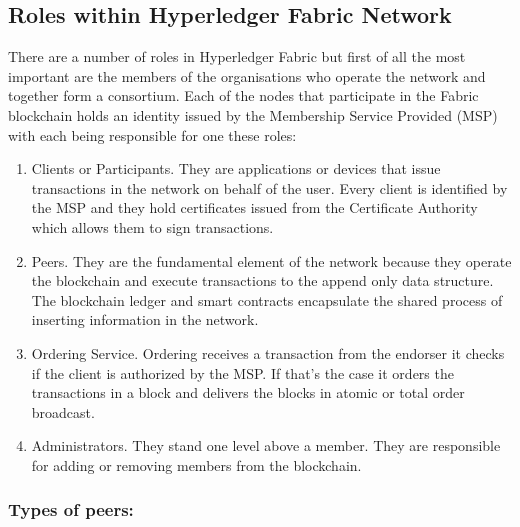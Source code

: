 \subsection{Roles within Hyperledger Fabric Network}
There are a number of roles in Hyperledger Fabric but first of all the most important are the members of the organisations who operate the network and together form a consortium.
Each of the nodes that participate in the Fabric blockchain holds an identity issued by the Membership Service Provided (MSP) with each being responsible for one these roles:
\begin{enumerate}
  \item Clients or Participants. They are applications or devices that issue transactions in the network on behalf of the user. Every client is identified by the MSP and they hold certificates issued from the Certificate Authority which allows them to sign transactions.
  \item Peers. They are the fundamental element of the network because they operate the blockchain and execute transactions to the append only data structure. The blockchain ledger and smart contracts encapsulate the shared process of inserting information in the network. 
  
  \item Ordering Service. Ordering receives a transaction from the endorser it checks if the client is authorized by the MSP. If that's the case it orders the transactions in a block and delivers the blocks in atomic or total order broadcast. 
  
  \item Administrators. They stand one level above a member. They are responsible for adding or removing members from the blockchain. 
  
\end{enumerate}

\subsubsection{Types of peers: }


